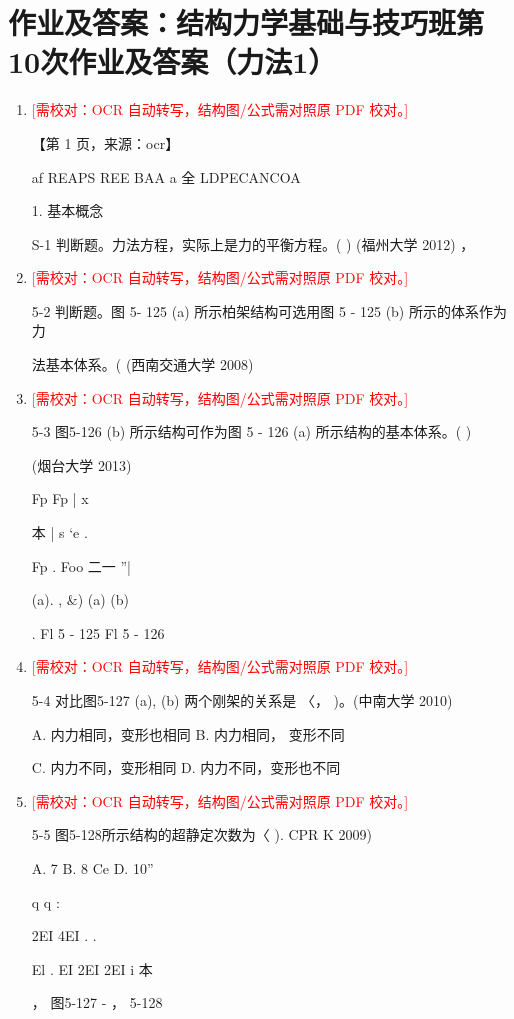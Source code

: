 \documentclass[UTF8,12pt,a4paper,openany]{ctexbook}
\newcommand{\TODO}[1]{\textcolor{red}{[需校对：#1]}}
\begin{document}
\section{作业及答案：结构力学基础与技巧班第10次作业及答案（力法1）}
\begin{enumerate}[label=\textbf{\arabic*.},leftmargin=2em]
\item \TODO{OCR 自动转写，结构图/公式需对照原 PDF 校对。}\par 【第 1 页，来源：ocr】\par af REAPS REE BAA a 全 LDPECANCOA\par 1. 基本概念\par S-1 判断题。力法方程，实际上是力的平衡方程。( ) (福州大学 2012) ，
\item \TODO{OCR 自动转写，结构图/公式需对照原 PDF 校对。}\par 5-2 判断题。图 5- 125 (a) 所示柏架结构可选用图 5 - 125 (b) 所示的体系作为力\par 法基本体系。( (西南交通大学 2008)
\item \TODO{OCR 自动转写，结构图/公式需对照原 PDF 校对。}\par 5-3 图5-126 (b) 所示结构可作为图 5 - 126 (a) 所示结构的基本体系。(  )\par (烟台大学 2013)\par Fp               Fp             |                x\par 本               |                              s         ‘e                 .\par Fp      .     Foo    二一 ”|\par (a).              , \&)              (a)               (b)\par .         Fl 5 - 125                          Fl 5 - 126
\item \TODO{OCR 自动转写，结构图/公式需对照原 PDF 校对。}\par 5-4 对比图5-127 (a), (b) 两个刚架的关系是 〈， )。(中南大学 2010)\par A. 内力相同，变形也相同         B. 内力相同， 变形不同\par C. 内力不同，变形相同          D. 内力不同，变形也不同
\item \TODO{OCR 自动转写，结构图/公式需对照原 PDF 校对。}\par 5-5 图5-128所示结构的超静定次数为〈 ). CPR K 2009)\par A. 7          B. 8     Ce          D. 10”\par q               q       :\par 2EI    4EI                       .      .\par El   .   EI       2EI      2EI  i  本\par ，                          图5-127 -                  ， 5-128

\end{enumerate}
\end{document}
